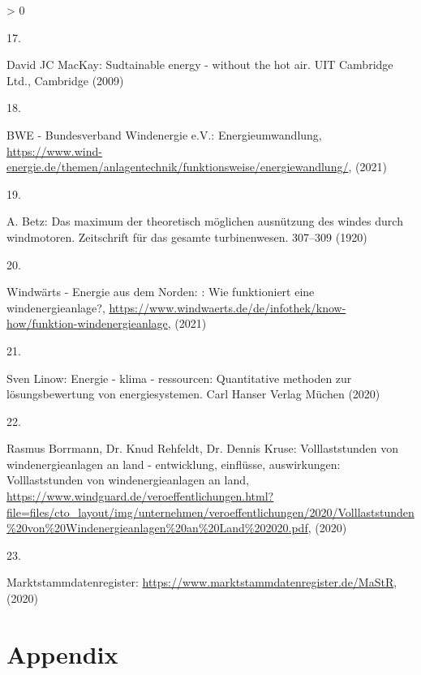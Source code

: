 \documentclass[a4paper,11pt]{article}
\newlength{\cslhangindent}
\newlength{\csllabelwidth}
\newenvironment{CSLReferences}[3] %
 {%
  \setlength{\parindent}{0pt}
  \ifodd #1 \everypar{\setlength{\hangindent}{\cslhangindent}}\ignorespaces\fi
  \ifnum #2 > 0
  \setlength{\parskip}{#2\baselineskip}
  \fi
 }%
 {}
\newcommand{\CSLLeftMargin}[1]{\parbox[t]{\maxof{\widthof{#1}}{\csllabelwidth}}{#1}}
\newcommand{\CSLRightInline}[1]{\parbox[t]{\linewidth}{#1}}
\begin{document}
\begin{CSLReferences}{0}{0}
\leavevmode\hypertarget{ref-DavidJCMacKay.2009}{}%
\CSLLeftMargin{17. }
\CSLRightInline{David JC MacKay: Sudtainable energy - without the hot air. {UIT Cambridge Ltd.}, Cambridge (2009)}

\leavevmode\hypertarget{ref-BWE.2021}{}%
\CSLLeftMargin{18. }
\CSLRightInline{BWE - Bundesverband Windenergie e.V.: Energieumwandlung, \url{https://www.wind-energie.de/themen/anlagentechnik/funktionsweise/energiewandlung/}, (2021)}

\leavevmode\hypertarget{ref-A.Betz.1920}{}%
\CSLLeftMargin{19. }
\CSLRightInline{A. Betz: Das maximum der theoretisch m{ö}glichen ausn{ü}tzung des windes durch windmotoren. Zeitschrift f{ü}r das gesamte turbinenwesen. 307--309 (1920)}

\leavevmode\hypertarget{ref-WindwartsEnergieausdemNorden.2021}{}%
\CSLLeftMargin{20. }
\CSLRightInline{Windwärts - Energie aus dem Norden: : Wie funktioniert eine windenergieanlage?, \url{https://www.windwaerts.de/de/infothek/know-how/funktion-windenergieanlage}, (2021)}

\leavevmode\hypertarget{ref-SvenLinow.2020}{}%
\CSLLeftMargin{21. }
\CSLRightInline{Sven Linow: Energie - klima - ressourcen: Quantitative methoden zur l{ö}sungsbewertung von energiesystemen. {Carl Hanser Verlag M{ü}chen} (2020)}

\leavevmode\hypertarget{ref-RasmusBorrmannDr.KnudRehfeldtDr.DennisKruse.2020}{}%
\CSLLeftMargin{22. }
\CSLRightInline{Rasmus Borrmann, Dr. Knud Rehfeldt, Dr. Dennis Kruse: Volllaststunden von windenergieanlagen an land - entwicklung, einfl{ü}sse, auswirkungen: Volllaststunden von windenergieanlagen an land, \url{https://www.windguard.de/veroeffentlichungen.html?file=files/cto_layout/img/unternehmen/veroeffentlichungen/2020/Volllaststunden\%20von\%20Windenergieanlagen\%20an\%20Land\%202020.pdf}, (2020)}

\leavevmode\hypertarget{ref-Marktstammdatenregister.2020}{}%
\CSLLeftMargin{23. }
\CSLRightInline{Marktstammdatenregister: \url{https://www.marktstammdatenregister.de/MaStR}, (2020)}

\end{CSLReferences}
\indent
\setlength{\parindent}{17pt}
\setlength{\leftskip}{0pt}
\setlength{\parskip}{0pt}

\newpage

\appendix

\hypertarget{appendix}{%
\section{Appendix}\label{appendix}}
\end{document}
